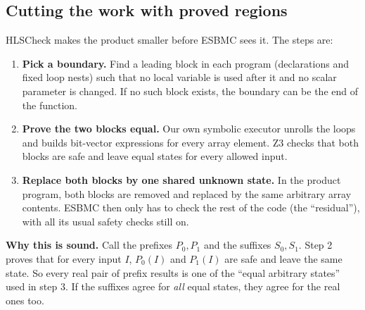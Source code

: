 \documentclass[10pt,a4paper]{article}
\begin{document}
\subsection{Cutting the work with proved regions}
HLSCheck makes the product smaller before ESBMC sees it. The steps are:
\begin{enumerate}
\item \textbf{Pick a boundary.} Find a leading block in each program (declarations and fixed loop
nests) such that no local variable is used after it and no scalar parameter is changed. If no such
block exists, the boundary can be the end of the function.
\item \textbf{Prove the two blocks equal.} Our own symbolic executor unrolls the loops and
builds bit-vector expressions for every array element. Z3 checks that both blocks are safe and leave
equal states for every allowed input.
\item \textbf{Replace both blocks by one shared unknown state.} In the product program, both blocks
are removed and replaced by the same arbitrary array contents. ESBMC then only has to check the rest
of the code (the ``residual''), with all its usual safety checks still on.
\end{enumerate}
\begin{center}
\end{center}
\textbf{Why this is sound.} Call the prefixes $P_0,P_1$ and the suffixes $S_0,S_1$. Step 2 proves
that for every input $I$, $P_0(I)$ and $P_1(I)$ are safe and leave the same state. So every real
pair of prefix results is one of the ``equal arbitrary states'' used in step 3. If the suffixes agree
for \emph{all} equal states, they agree for the real ones too.
\end{document}
